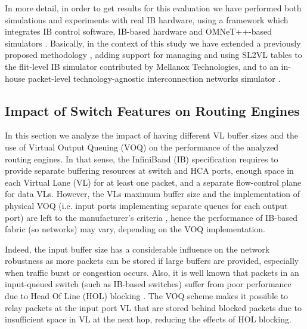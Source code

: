 \documentclass[review]{elsarticle}
\newcommand{\ib}{IB}
\newcommand{\ibl}{InfiniBand}
\begin{document}
In more detail, in order to get results for this evaluation we have performed both simulations and experiments with real \ib{} hardware,
using a framework which integrates \ib{} control software, \ib-based hardware and OMNeT++-based simulators \cite{OMNeTManual}.
Basically, in the context of this study we have extended  a previously proposed methodology \cite{maglione2018_d3r, raap-tools},
adding support for managing and using SL2VL tables to the flit-level \ib{} simulator contributed
by Mellanox Technologies\texttrademark \cite{maglione2018_d3r}, and
to an in-house packet-level technology-agnostic interconnection networks simulator \cite{yebenes13_sauron}.

\subsection{Impact of Switch Features on Routing Engines}
\label{s_sim_sw_features}
In this section we analyze the impact of having different VL buffer sizes and the use of Virtual Output Queuing (VOQ)
on the performance of the analyzed routing engines.
In that sense, the \ibl{} (\ib{}) specification requires to provide separate buffering resources at switch and HCA ports,
enough space in each Virtual Lane (VL) for at least one packet, and a separate flow-control plane for data VLs.
However, the VLs maximum buffer size and the implementation of physical VOQ \cite{voq_tamir88}
(i.e. input ports implementing separate queues for each output port) are left to the manufacturer's criteria  \cite{IBA2015},
hence the performance of \ib-based fabric (so networks) may vary, depending on the VOQ implementation.

Indeed, the input buffer size has a considerable influence on the network robustness as more packets can be stored if large buffers are provided, especially when traffic burst or congestion occurs.
Also, it is well known that packets in an input-queued switch (such as \ib-based switches) suffer from poor performance due to Head Of Line (HOL) blocking \cite{hol_karol87}.
The VOQ scheme makes it possible to relay packets at the input port VL that are stored behind blocked packets
due to insufficient space in VL at the next hop, reducing the effects of HOL blocking.
\end{document}
